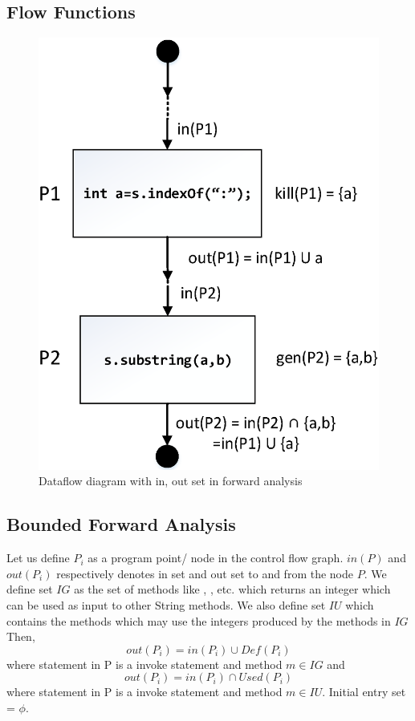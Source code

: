\subsection{Flow Functions}
\label{subsec:flowFunctions}

\begin{figure}[t]
\centering
\includegraphics[scale=.35]{images/dataflow.png}
\caption{Dataflow diagram with in, out set in forward analysis}
\label{fig:dataflow}
\end{figure}

\subsection{Bounded Forward Analysis}
\label{subsec:boundedForward}

Let us define $P_i$ as a program point/ node in the control flow graph. $in(P)$
and $out(P_i)$ respectively denotes in set and out set to and from the node $P$.
We define set $IG$ as the set of methods like ,
,  etc. which returns an integer
which can be used as input to other String methods. We also define set $IU$
which contains the methods which may use the integers produced by the methods in
$IG$ Then, 
$$out(P_i) = in(P_i) \cup Def(P_i)$$ where statement in P is a invoke statement
and method $m \in IG$ and
$$out(P_i) = in(P_i) \cap Used(P_i)$$ where statement in P is a invoke statement
and method $m \in IU$. Initial entry set = ${\phi}$.


